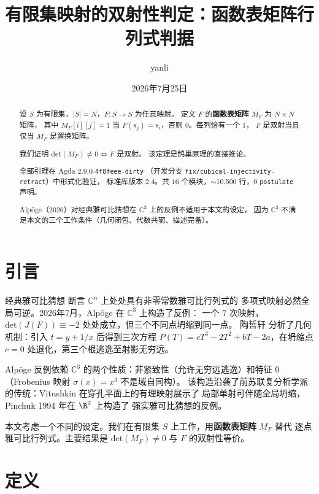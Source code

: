 \documentclass[a4paper,11pt]{article}
\title{有限集映射的双射性判定：函数表矩阵行列式判据}
\author{yanli}
\date{2026年7月25日}
\theoremstyle{remark}
\newcommand{\C}{\mathbb{C}}
\newcommand{\MF}{M_F}
\newcommand{\Det}{\mathrm{det}}
\newcommand{\Jac}{J(F)}
\newcommand{\Frob}{\sigma}
\begin{document}
\maketitle

\begin{abstract}
设 $S$ 为有限集，$|S|=N$，$F:S\to S$ 为任意映射。
定义 $F$ 的\textbf{函数表矩阵} $\MF$ 为 $N\times N$ 矩阵，
其中 $\MF[i][j]=1$ 当 $F(s_j)=s_i$，否则 $0$。每列恰有一个 $1$，
$F$ 是双射当且仅当 $\MF$ 是置换矩阵。

我们证明 $\Det(\MF)\neq 0 \iff F$ 是双射。
该定理是鸽巢原理的直接推论。

全部引理在 Agda $2.9.0$-\texttt{4f8feee-dirty}
（开发分支 \texttt{fix/cubical-injectivity-retract}）中形式化验证，
标准库版本 $2.4$。共 $16$ 个模块，$\sim$10,500 行，$0$ \texttt{postulate} 声明。

Alp\"{o}ge（2026）对经典雅可比猜想在 $\C^3$ 上的反例不适用于本文的设定，
因为 $\C^3$ 不满足本文的三个工作条件（几何闭包、代数共轭、描述完备）。
\end{abstract}

\section{引言}

经典雅可比猜想 \cite{keller} 断言 $\C^n$ 上处处具有非零常数雅可比行列式的
多项式映射必然全局可逆。2026年7月，Alp\"{o}ge \cite{alpoge} 在 $\C^3$ 上构造了反例：
一个 $7$ 次映射，$\Det(\Jac)\equiv-2$ 处处成立，但三个不同点坍缩到同一点。
陶哲轩 \cite{tao} 分析了几何机制：引入 $t=y+1/x$ 后得到三次方程
$P(T)=cT^3-2T^2+bT-2a$，在坍缩点 $c=0$ 处退化，第三个根逃逸至射影无穷远。

Alp\"{o}ge 反例依赖 $\C^3$ 的两个性质：非紧致性（允许无穷远逃逸）和特征 $0$
（Frobenius 映射 $\Frob(x)=x^3$ 不是域自同构）。
该构造沿袭了前苏联复分析学派的传统：Vitushkin 在穿孔平面上的有理映射展示了
局部单射可伴随全局坍缩，Pinchuk \cite{pinchuk} 1994 年在 $\R^2$ 上构造了
强实雅可比猜想的反例。

本文考虑一个不同的设定。我们在有限集 $S$ 上工作，用\textbf{函数表矩阵} $\MF$ 替代
逐点雅可比行列式。主要结果是 $\Det(\MF)\neq 0$ 与 $F$ 的双射性等价。

\section{定义}
\end{document}
